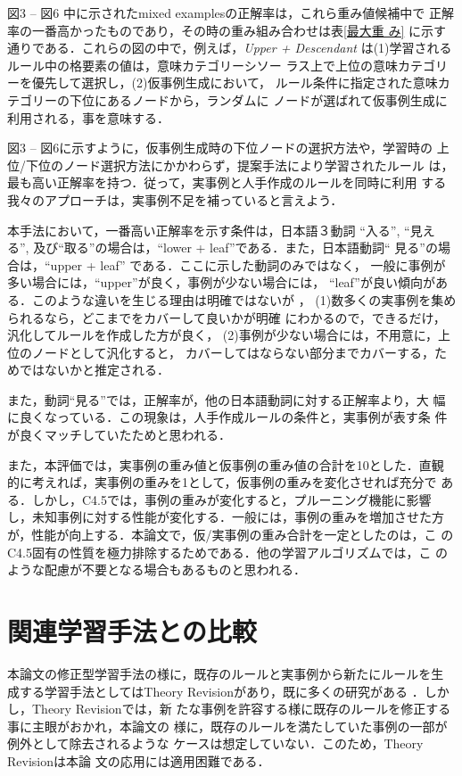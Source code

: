 図3 -- 図6 中に示されたmixed examplesの正解率は，これら重み値候補中で
正解率の一番高かったものであり，その時の重み組み合わせは表\ref{最大重
み} に示す通りである．これらの図の中で，例えば，{\em Upper   +
Descendant} は(1)学習されるルール中の格要素の値は，意味カテゴリーシソー
ラス上で上位の意味カテゴリーを優先して選択し，(2)仮事例生成において，
ルール条件に指定された意味カテゴリーの下位にあるノードから，ランダムに
ノードが選ばれて仮事例生成に利用される，事を意味する．

図3 -- 図6に示すように，仮事例生成時の下位ノードの選択方法や，学習時の
上位/下位のノード選択方法にかかわらず，提案手法により学習されたルール
は，最も高い正解率を持つ．従って，実事例と人手作成のルールを同時に利用
する我々のアプローチは，実事例不足を補っていると言えよう．

本手法において，一番高い正解率を示す条件は，日本語３動詞 ``入る'', ``見え
る'', 及び``取る''の場合は，``lower + leaf''である．また，日本語動詞``
見る''の場合は，``upper + leaf'' である．ここに示した動詞のみではなく，
一般に事例が多い場合には，``upper''が良く，事例が少ない場合には，
``leaf''が良い傾向がある．このような違いを生じる理由は明確ではないが ，
(1)数多くの実事例を集められるなら，どこまでをカバーして良いかが明確
にわかるので，できるだけ，汎化してルールを作成した方が良く，
(2)事例が少ない場合には，不用意に，上位のノードとして汎化すると，
カバーしてはならない部分までカバーする，ためではないかと推定される．

また，動詞``見る''では，正解率が，他の日本語動詞に対する正解率より，大
幅に良くなっている．この現象は，人手作成ルールの条件と，実事例が表す条
件が良くマッチしていたためと思われる．

また，本評価では，実事例の重み値と仮事例の重み値の合計を10とした．直観
的に考えれば，実事例の重みを1として，仮事例の重みを変化させれば充分で
ある．しかし，C4.5では，事例の重みが変化すると，プルーニング機能に影響
し，未知事例に対する性能が変化する．一般には，事例の重みを増加させた方
が，性能が向上する．本論文で，仮/実事例の重み合計を一定としたのは，こ
のC4.5固有の性質を極力排除するためである．他の学習アルゴリズムでは，こ
のような配慮が不要となる場合もあるものと思われる．

\section{関連学習手法との比較}
本論文の修正型学習手法の様に，既存のルールと実事例から新たにルールを生
成する学習手法としてはTheory Revisionがあり，既に多くの研究がある
\cite{Tangkitvanich93,Raedt92}．しかし，Theory Revisionでは，新
たな事例を許容する様に既存のルールを修正する事に主眼がおかれ，本論文の
様に，既存のルールを満たしていた事例の一部が例外として除去されるような
ケースは想定していない\cite{Murphy94}．このため，Theory Revisionは本論
文の応用には適用困難である．

